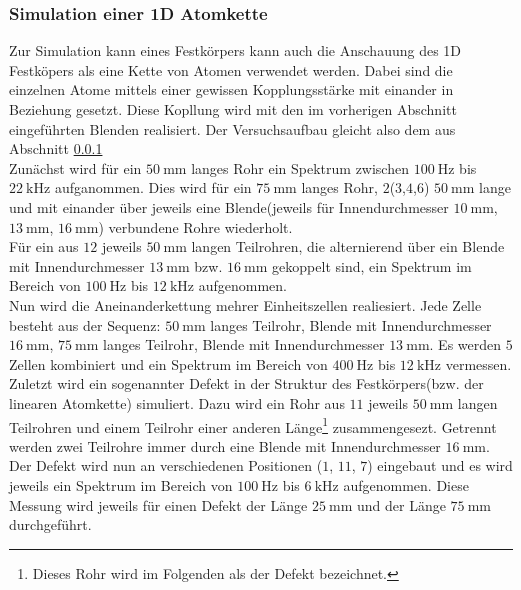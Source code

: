\subsubsection{Simulation einer 1D Atomkette}
\label{subsubsec:ch4b}
Zur Simulation kann eines Festkörpers kann auch die
Anschauung des 1D Festköpers als eine Kette von Atomen verwendet werden.
Dabei sind die einzelnen Atome mittels einer gewissen Kopplungsstärke
mit einander in Beziehung gesetzt. Diese Kopllung wird mit den im
vorherigen Abschnitt eingeführten Blenden realisiert. Der Versuchsaufbau
gleicht also dem aus Abschnitt \ref{subsubsec:ch4b}\\
Zunächst wird für ein $\SI{50}{\milli\meter}$ langes Rohr
ein Spektrum zwischen $\SI{100}{\hertz}$ bis $\SI{22}{\kilo\hertz}$
aufganommen. Dies wird für ein $\SI{75}{\milli\meter}$ langes Rohr, $2$($3$,$4$,$6$)
$\SI{50}{\milli\meter}$ lange und mit einander über jeweils eine
Blende(jeweils für Innendurchmesser $\SI{10}{\milli\meter}$,
$\SI{13}{\milli\meter}$, $\SI{16}{\milli\meter}$) verbundene Rohre wiederholt.\\
Für ein aus $12$ jeweils $\SI{50}{\milli\meter}$ langen Teilrohren, die
alternierend über ein Blende mit Innendurchmesser $\SI{13}{\milli\meter}$ bzw.
$\SI{16}{\milli\meter}$ gekoppelt sind, ein Spektrum im Bereich von
$\SI{100}{\hertz}$ bis $\SI{12}{\kilo\hertz}$ aufgenommen.\\
Nun wird die Aneinanderkettung mehrer Einheitszellen realiesiert.
Jede Zelle besteht aus der Sequenz: $\SI{50}{\milli\meter}$ langes Teilrohr,
Blende mit Innendurchmesser $\SI{16}{\milli\meter}$, $\SI{75}{\milli\meter}$
langes Teilrohr, Blende mit Innendurchmesser $\SI{13}{\milli\meter}$.
Es werden $5$ Zellen kombiniert und ein Spektrum im Bereich von
$\SI{400}{\hertz}$ bis $\SI{12}{\kilo\hertz}$ vermessen.\\
Zuletzt wird ein sogenannter Defekt in der Struktur des Festkörpers(bzw. der linearen Atomkette)
simuliert. Dazu wird ein Rohr aus $11$ jeweils $\SI{50}{\milli\meter}$
langen Teilrohren und einem Teilrohr einer anderen
Länge\footnote{Dieses Rohr wird im Folgenden als der Defekt bezeichnet.}
zusammengesezt. Getrennt werden zwei Teilrohre immer durch eine
Blende mit Innendurchmesser $\SI{16}{\milli\meter}$.
Der Defekt wird nun an verschiedenen Positionen ($1$, $11$, $7$) eingebaut und
es wird jeweils ein Spektrum im Bereich von $\SI{100}{\hertz}$ bis $\SI{6}{\kilo\hertz}$ aufgenommen.
Diese Messung wird jeweils für einen Defekt der Länge $\SI{25}{\milli\meter}$
und der Länge $\SI{75}{\milli\meter}$ durchgeführt.
